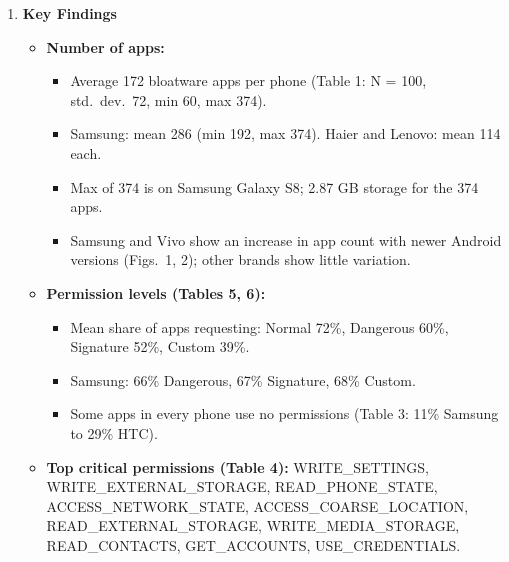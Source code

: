 \documentclass[11pt,a4paper]{article}
\newcommand{\entrypart}[1]{\textbf{\color{accent}#1}\par\vspace{2pt}}
\begin{document}
\begin{enumerate}
\begin{itemize}[leftmargin=*, itemsep=1pt, topsep=2pt]
        \begin{itemize}[itemsep=0pt]
            \item Number of apps per device (mean, std.\ dev., min, max).
            \item Permissions per app; share of apps requesting each protection level.
            \item Average number of apps per phone requesting specific permissions.
            \item Survey response percentages.
        \end{itemize}
        \item \textbf{Baseline comparison:} Not Specified.
    \end{itemize}

    \item \entrypart{Key Findings}
    \begin{itemize}[leftmargin=*, itemsep=1pt, topsep=2pt]
        \item \textbf{Number of apps:}
        \begin{itemize}[itemsep=0pt]
            \item Average 172 bloatware apps per phone (Table 1: N = 100, std.\ dev.\ 72, min 60, max 374).
            \item Samsung: mean 286 (min 192, max 374). Haier and Lenovo: mean 114 each.
            \item Max of 374 is on Samsung Galaxy S8; 2.87 GB storage for the 374 apps.
            \item Samsung and Vivo show an increase in app count with newer Android versions (Figs.\ 1, 2); other brands show little variation.
        \end{itemize}
        \item \textbf{Permission levels (Tables 5, 6):}
        \begin{itemize}[itemsep=0pt]
            \item Mean share of apps requesting: Normal 72\%, Dangerous 60\%, Signature 52\%, Custom 39\%.
            \item Samsung: 66\% Dangerous, 67\% Signature, 68\% Custom.
            \item Some apps in every phone use no permissions (Table 3: 11\% Samsung to 29\% HTC).
        \end{itemize}
        \item \textbf{Top critical permissions (Table 4):} WRITE\_SETTINGS, WRITE\_EXTERNAL\_STORAGE, READ\_PHONE\_STATE, ACCESS\_NETWORK\_STATE, ACCESS\_COARSE\_LOCATION, READ\_EXTERNAL\_STORAGE, WRITE\_MEDIA\_STORAGE, READ\_CONTACTS, GET\_ACCOUNTS, USE\_CREDENTIALS.

\end{itemize}
\end{enumerate}
\end{document}
